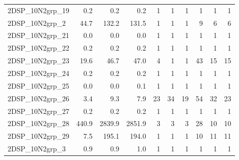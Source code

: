\documentclass[a4paper,10pt]{article}
\theoremstyle{definition}
\begin{document}
\begin{table}[t]
\begin{scriptsize}
\begin{tabular*}{\textwidth}{@{}l@{\;\;\extracolsep{\fill}}rrrrrrrrr@{}}
 2DSP\_10N2grp\_19 & \num{   0.2} & \num{   0.2} & \num{   0.2} & \num{         1} & \num{         1} & \num{         1} & \num{         1} & \num{         1} & \num{         1}\\
  2DSP\_10N2grp\_2 & \num{  44.7} & \num{ 132.2} & \num{ 131.5} & \num{         1} & \num{         1} & \num{         1} & \num{         9} & \num{         6} & \num{         6}\\
 2DSP\_10N2grp\_21 & \num{   0.0} & \num{   0.0} & \num{   0.0} & \num{         1} & \num{         1} & \num{         1} & \num{         1} & \num{         1} & \num{         1}\\
 2DSP\_10N2grp\_22 & \num{   0.2} & \num{   0.2} & \num{   0.2} & \num{         1} & \num{         1} & \num{         1} & \num{         1} & \num{         1} & \num{         1}\\
 2DSP\_10N2grp\_23 & \num{  19.6} & \num{  46.7} & \num{  47.0} & \num{         4} & \num{         1} & \num{         1} & \num{        43} & \num{        15} & \num{        15}\\
 2DSP\_10N2grp\_24 & \num{   0.2} & \num{   0.2} & \num{   0.2} & \num{         1} & \num{         1} & \num{         1} & \num{         1} & \num{         1} & \num{         1}\\
 2DSP\_10N2grp\_25 & \num{   0.0} & \num{   0.0} & \num{   0.1} & \num{         1} & \num{         1} & \num{         1} & \num{         1} & \num{         1} & \num{         1}\\
 2DSP\_10N2grp\_26 & \num{   3.4} & \num{   9.3} & \num{   7.9} & \num{        23} & \num{        34} & \num{        19} & \num{        54} & \num{        32} & \num{        23}\\
 2DSP\_10N2grp\_27 & \num{   0.2} & \num{   0.2} & \num{   0.2} & \num{         1} & \num{         1} & \num{         1} & \num{         1} & \num{         1} & \num{         1}\\
 2DSP\_10N2grp\_28 & \num{ 440.9} & \num{2839.9} & \num{2851.9} & \num{         3} & \num{         3} & \num{         3} & \num{        28} & \num{        10} & \num{        10}\\
 2DSP\_10N2grp\_29 & \num{   7.5} & \num{ 195.1} & \num{ 194.0} & \num{         1} & \num{         1} & \num{         1} & \num{        10} & \num{        11} & \num{        11}\\
  2DSP\_10N2grp\_3 & \num{   0.9} & \num{   0.9} & \num{   1.0} & \num{         1} & \num{         1} & \num{         1} & \num{         1} & \num{         1} & \num{         1}\\

\end{tabular*}
\end{scriptsize}
\end{table}
\end{document}

